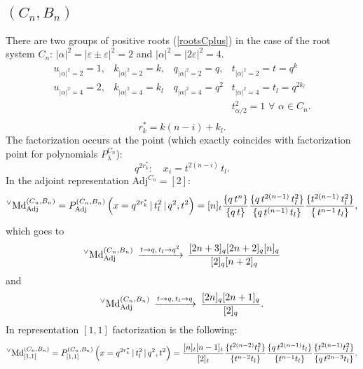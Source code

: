 \documentclass{article}
\def\MDv{{^\vee\hbox{Md}}}
\def\Adj{\text{Adj}}
\begin{document}
\subsection{$(C_n, B_n)$}
There are two groups of positive roots (\ref{rootsCplus}) in the case of the root system $C_n$: $|\alpha|^2=|\varepsilon \pm \varepsilon|^2 = 2$ and $|\alpha|^2= |2\varepsilon|^2 = 4$.
\begin{equation}
    \begin{array}{llll}
   u_{|\alpha|^2 = 2} = 1, &  k_{|\alpha|^2 = 2} = k,  &    q_{|\alpha|^2 = 2} = q, & t_{|\alpha|^2 = 2} =t= q^{k}  \\
      u_{|\alpha|^2 = 4} = 2, & k_{|\alpha|^2 = 4} = k_l &    q_{|\alpha|^2 = 4} = q^{2}&  t_{|\alpha|^2 = 4} = t_l=q^{2 k_l} \\
      &&& t_{\alpha/2}^2 = 1 \,\, \forall \,\, \alpha \in C_n.\\
    \end{array}
\end{equation}
\begin{equation}
    r_k^* = k(n-i) +k_l.
\end{equation}
The factorization occurs at the point (which exactly coincides with factorization point for polynomials $P^{C_n}_{\lambda}$):
\begin{equation}
    q^{2r^*_k}: \quad x_i = t^{2(n-i)}\, t_l.
\end{equation}
In the adjoint representation $\Adj^{C_n} = [2]$:
\begin{equation}
  \MDv_{\Adj}^{(C_n,B_n)} =  P_{\Adj}^{(C_n,B_n)} \left(x = q^{2r_k^*}\,|\, t_l^2\,|\,q^2,t^2 \right) = [n]_t \frac{\{q\, t^n\}}{\{q \,t\}}\frac{\{q \,t^{2(n-1)}\, t_l^2\}}{\{q\,t^{(n-1)}\,t_l\}} \frac{\{t^{2(n-1)}\, t_l^2\}}{\{\,t^{n-1}\,t_l\}},
\end{equation}
which goes to
\begin{equation}
    \MDv_{\Adj}^{(C_n,B_n)} \,\xrightarrow[]{t\rightarrow q,\, t_l \rightarrow q^2} \, \frac{[2n+3]_q[2n+2]_q[n]_q}{[2]_q[n+2]_q}
\end{equation}
and
\begin{equation}
    \MDv_{\Adj}^{(C_n,B_n)} \,\xrightarrow[]{t\rightarrow q,\, t_l \rightarrow q} \, \frac{[2n]_q[2n+1]_q}{[2]_q}.
\end{equation}
\noindent
In representation $[1,1]$ factorization is the following:
\begin{align}
\MDv_{[1,1]}^{(C_n,B_n)}=P_{[1,1]}^{(C_n,B_n)}\left(x = q^{2r_k^*}\,|\, t_l^2\,|\,q^2,t^2 \right) =
 \frac{[n]_t[n-1]_t}{[2]_t}
\frac{\{t^{2(n-2)}t_l^2\}}{\{t^{n-2}t_l\}}
\frac{\{q\,t^{2(n-1)}t_l\}}{\{t^{n-1}t_l\}} \frac{\{t^{2(n-1)}t_l^2\}}{\{q\,t^{2n-3}t_l\}}.
\end{align}
\end{document}
